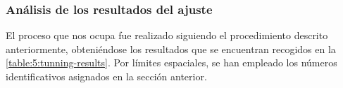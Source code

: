 \subsubsection{Análisis de los resultados del ajuste}
\label{sec:5:resultados-ajuste}

El proceso que nos ocupa fue realizado siguiendo el procedimiento descrito anteriormente, obteniéndose los resultados que se encuentran recogidos en la \autoref{table:5:tunning-results}. Por límites espaciales, se han empleado los números identificativos asignados en la sección anterior.

\begin{table}[h]
	\centering
	\caption{Resultados del ajuste paramétrico.}
	\label{table:5:tunning-results}
\end{table}

